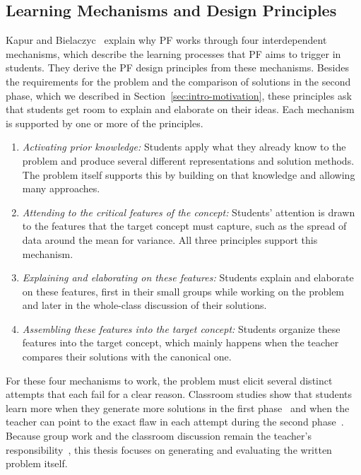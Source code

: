 \subsection{Learning Mechanisms and Design Principles}
\label{subsec:bg-pf-mechanisms}
Kapur and Bielaczyc~\cite{kapur2012} explain why PF works through four interdependent mechanisms, which describe the learning processes that PF aims to trigger in students. They derive the PF design principles from these mechanisms. Besides the requirements for the problem and the comparison of solutions in the second phase, which we described in Section~\ref{sec:intro-motivation}, these principles ask that students get room to explain and elaborate on their ideas. Each mechanism is supported by one or more of the principles.
\begin{enumerate}[label=(\alph*),leftmargin=0.9cm,itemsep=0.25em,topsep=0.3em]
    \item \emph{Activating prior knowledge:} Students apply what they already know to the problem and produce several different representations and solution methods. The problem itself supports this by building on that knowledge and allowing many approaches.
    \item \emph{Attending to the critical features of the concept:} Students' attention is drawn to the features that the target concept must capture, such as the spread of data around the mean for variance. All three principles support this mechanism.
    \item \emph{Explaining and elaborating on these features:} Students explain and elaborate on these features, first in their small groups while working on the problem and later in the whole-class discussion of their solutions.
    \item \emph{Assembling these features into the target concept:} Students organize these features into the target concept, which mainly happens when the teacher compares their solutions with the canonical one.
\end{enumerate}

For these four mechanisms to work, the problem must elicit several distinct attempts that each fail for a clear reason. Classroom studies show that students learn more when they generate more solutions in the first phase~\cite{kapur2023inventive} and when the teacher can point to the exact flaw in each attempt during the second phase~\cite{loibl2014}. Because group work and the classroom discussion remain the teacher's responsibility~\cite{kapur2012}, this thesis focuses on generating and evaluating the written problem itself.

